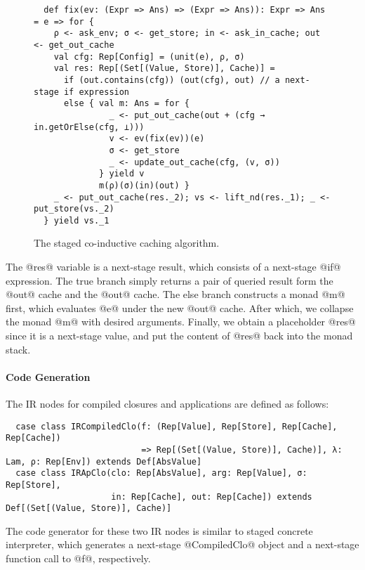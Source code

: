 \vspace{-1em}
\begin{figure}[h!]
  \centering
\begin{lstlisting}
  def fix(ev: (Expr => Ans) => (Expr => Ans)): Expr => Ans = e => for {
    ρ <- ask_env; σ <- get_store; in <- ask_in_cache; out <- get_out_cache
    val cfg: Rep[Config] = (unit(e), ρ, σ)
    val res: Rep[(Set[(Value, Store)], Cache)] =
      if (out.contains(cfg)) (out(cfg), out) // a next-stage if expression
      else { val m: Ans = for {
               _ <- put_out_cache(out + (cfg → in.getOrElse(cfg, ⊥)))
               v <- ev(fix(ev))(e)
               σ <- get_store
               _ <- update_out_cache(cfg, (v, σ))
             } yield v
             m(ρ)(σ)(in)(out) }
    _ <- put_out_cache(res._2); vs <- lift_nd(res._1); _ <- put_store(vs._2)
  } yield vs._1
\end{lstlisting}
\vspace{-1em}
\caption{The staged co-inductive caching algorithm.}
\label{fig:staged_coind_cache}
\end{figure}
\vspace{-1em}

The @res@ variable is a next-stage result, which consists of a next-stage @if@
expression. The true branch simply returns a pair of queried result form the
@out@ cache and the @out@ cache. The else branch constructs a monad @m@ first,
which evaluates @e@ under the new @out@ cache. After which, we collapse the
monad @m@ with desired arguments. Finally, we obtain a placeholder @res@ since
it is a next-stage value, and put the content of @res@ back into the monad
stack.

\paragraph{Code Generation} The IR nodes for compiled closures and
applications are defined as follows:

\begin{lstlisting}
  case class IRCompiledClo(f: (Rep[Value], Rep[Store], Rep[Cache], Rep[Cache])
                           => Rep[(Set[(Value, Store)], Cache)], λ: Lam, ρ: Rep[Env]) extends Def[AbsValue]
  case class IRApClo(clo: Rep[AbsValue], arg: Rep[Value], σ: Rep[Store],
                     in: Rep[Cache], out: Rep[Cache]) extends Def[(Set[(Value, Store)], Cache)]
\end{lstlisting}

The code generator for these two IR nodes is similar to staged concrete
interpreter, which generates a next-stage @CompiledClo@ object and a next-stage
function call to @f@, respectively.
                   
